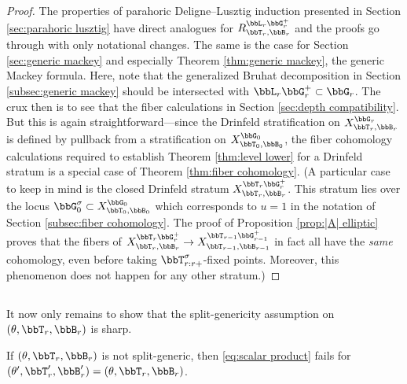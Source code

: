 \begin{proof}
  The properties of parahoric Deligne--Lusztig induction presented in Section \ref{sec:parahoric lusztig} have direct analogues for $R_{\bbT_r,\bbB_r}^{\bbL_r\bbG_r^+}$ and the proofs go through with only notational changes. The same is the case for Section \ref{sec:generic mackey} and especially Theorem \ref{thm:generic mackey}, the generic Mackey formula. Here, note that the generalized Bruhat decomposition in Section \ref{subsec:generic mackey} should be intersected with $\bbL_r \bbG_r^+ \subset \bbG_r$. The crux then is to see that the fiber calculations in Section \ref{sec:depth compatibility}. But this is again straightforward---since the Drinfeld stratification on $X_{\bbT_r,\bbB_r}^{\bbG_r}$ is defined by pullback from a stratification on $X_{\bbT_0,\bbB_0}^{\bbG_0}$, the fiber cohomology calculations required to establish Theorem \ref{thm:level lower} for a Drinfeld stratum is a special case of Theorem \ref{thm:fiber cohomology}. (A particular case to keep in mind is the closed Drinfeld stratum $X_{\bbT_r,\bbB_r}^{\bbT_r\bbG_r^+}$. This stratum lies over the locus $\bbG_0^\sigma \subset X_{\bbT_0,\bbB_0}^{\bbG_0}$ which corresponds to $u = 1$ in the notation of Section \ref{subsec:fiber cohomology}. The proof of Proposition \ref{prop:|A| elliptic} proves that the fibers of $X_{\bbT_r,\bbB_r}^{\bbT_r\bbG_r^+} \to X_{\bbT_{r-1},\bbB_{r-1}}^{\bbT_{r-1}\bbG_{r-1}^+}$ in fact all have the \textit{same} cohomology, even before taking $\bbT_{r:r+}^\sigma$-fixed points. Moreover, this phenomenon does not happen for any other stratum.)
\end{proof}














\subsection{}

It now only remains to show that the split-genericity assumption on $(\theta,\bbT_r,\bbB_r)$ is sharp. 

\begin{proposition}
  If $(\theta,\bbT_r,\bbB_r)$ is not split-generic, then \eqref{eq:scalar product} fails for $(\theta',\bbT_r',\bbB_r') = (\theta,\bbT_r,\bbB_r)$.
\end{proposition}

